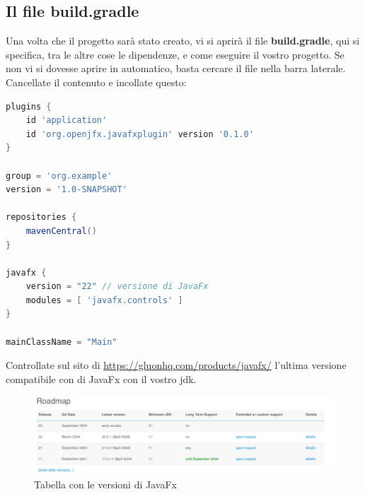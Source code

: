     \subsection{Il file build.gradle}
    Una volta che il progetto sarà stato creato, vi si aprirà il file \textbf{build.gradle}, qui si specifica, tra le altre cose le dipendenze, 
    e come eseguire il vostro progetto. Se non vi si dovesse aprire in automatico, basta cercare il file nella barra laterale. Cancellate il 
    contenuto e incollate questo:
    \begin{ret}
        \begin{lstlisting}[language=Groovy]
plugins {
    id 'application'
    id 'org.openjfx.javafxplugin' version '0.1.0'
}

group = 'org.example'
version = '1.0-SNAPSHOT'

repositories {
    mavenCentral()
}

javafx {
    version = "22" // versione di JavaFx
    modules = [ 'javafx.controls' ]
}

mainClassName = "Main"
        \end{lstlisting}
    \end{ret}
    \begin{warningbox}
        Controllate sul sito di \href{JavaFx}{https://gluonhq.com/products/javafx/} l'ultima versione compatibile con di JavaFx con il vostro jdk.
    \end{warningbox}
    \begin{figure}[H]
        \centering
        \graphicspath{{src/capitoli/05/img/}}
        \includegraphics[width=\textwidth]{javafx_versions.png}
        \caption{Tabella con le versioni di JavaFx}
        \label{fig:Tabella con le versioni di JavaFx}
    \end{figure}    


